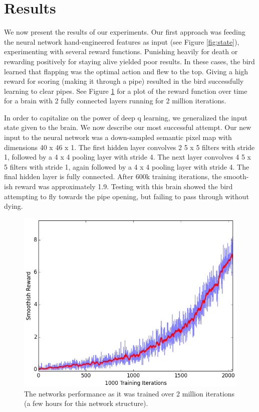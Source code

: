 \documentclass{chi2009}
\begin{document}
\section{Results}

We now present the results of our experiments. Our first approach was feeding the neural network hand-engineered features as input (see Figure \ref{fig:state}), experimenting with several reward functions. Punishing heavily for death or rewarding positively for staying alive yielded poor results. In these cases, the bird learned that flapping was the optimal action and flew to the top. Giving a high reward for scoring (making it through a pipe) resulted in the bird successfully learning to clear pipes. See Figure \ref{fig:plot} for a plot of the reward function over time for a brain with 2 fully connected layers running for 2 million iterations.

In order to capitalize on the power of deep q learning, we generalized the input state given to the brain. We now describe our most successful attempt. Our new input to the neural network was a down-sampled semantic pixel map with dimensions 40 x 46 x 1. The first hidden layer convolves 2 5 x 5 filters with stride 1, followed by a 4 x 4 pooling layer with stride 4. The next layer convolves 4 5 x 5 filters with stride 1, again followed by a 4 x 4 pooling layer with stride 4. The final hidden layer is fully connected. After 600k training iterations, the smooth-ish reward was approximately 1.9. Testing with this brain showed the bird attempting to fly towards the pipe opening, but failing to pass through without dying.

\begin{figure}[t]
\begin{center}
\includegraphics[width=\columnwidth]{figs/smooth_reward.png}
\vspace*{-0.09in}
\caption{The networks performance as it was trained over 2 million iterations (a few hours for this network structure).}
\label{fig:plot}
\end{center}
\end{figure}
\end{document}
